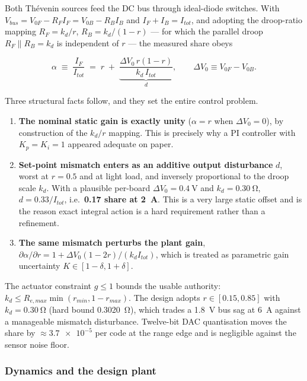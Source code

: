 Both Th\'evenin sources feed the DC bus through ideal-diode switches. With
$V_{bus}=V_{0F}-R_FI_F=V_{0B}-R_BI_B$ and $I_F+I_B=I_{tot}$, and adopting the
droop-ratio mapping $R_F = k_d/r$, $R_B = k_d/(1-r)$ --- for which the parallel droop
$R_F\!\parallel\!R_B = k_d$ is independent of $r$ --- the measured share obeys

\begin{equation}
\alpha \;\equiv\; \frac{I_F}{I_{tot}}
\;=\; r \;+\; \underbrace{\frac{\Delta V_0\,r(1-r)}{k_d\,I_{tot}}}_{d},
\qquad \Delta V_0 \equiv V_{0F}-V_{0B}.
\label{eq:share-static}
\end{equation}

Three structural facts follow, and they set the entire control problem.

\begin{enumerate}
\item \textbf{The nominal static gain is exactly unity} ($\alpha=r$ when $\Delta V_0=0$),
by construction of the $k_d/r$ mapping. This is precisely why a PI controller with
$K_p=K_i=1$ appeared adequate on paper.
\item \textbf{Set-point mismatch enters as an additive output disturbance} $d$, worst at
$r=0.5$ and at light load, and inversely proportional to the droop scale $k_d$. With a
plausible per-board $\Delta V_0 = \SI{0.4}{\volt}$ and $k_d = \SI{0.30}{\ohm}$,
$d = 0.33/I_{tot}$, i.e.\ \textbf{0.17 share at \SI{2}{\ampere}}. %
This is a very large static offset and is the reason exact integral action is a hard
requirement rather than a refinement.
\item \textbf{The same mismatch perturbs the plant gain},
$\partial\alpha/\partial r = 1 + \Delta V_0(1-2r)/(k_d I_{tot})$, which is treated as
parametric gain uncertainty $K\in[1-\delta,1+\delta]$.
\end{enumerate}

The actuator constraint $g\le 1$ bounds the usable authority:
$k_d \le R_{e,max}\min(r_{min},1-r_{max})$. The design adopts
$r\in[\num{0.15},\num{0.85}]$ with $k_d=\SI{0.30}{\ohm}$ (hard bound \SI{0.3020}{\ohm}),
which trades a \SI{1.8}{\volt} bus sag at \SI{6}{\ampere} against a manageable mismatch
disturbance. Twelve-bit DAC quantisation moves the share by $\approx\num{3.7e-5}$ per
code at the range edge and is negligible against the sensor noise floor.

\subsubsection{Dynamics and the design plant}

